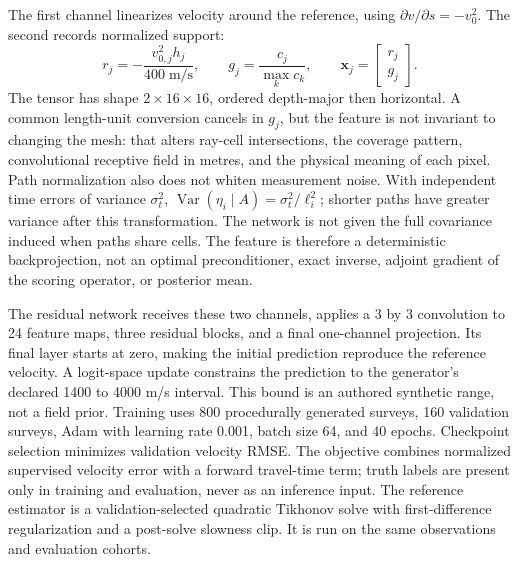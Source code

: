 The first channel linearizes velocity around the reference, using
$\partial v/\partial s=-v_0^2$. The second records normalized support:
\begin{equation}\label{eq:geometry-normalized-input}
 r_j=-\frac{v_{0,j}^2h_j}{400\;\mathrm{m/s}},\qquad
 g_j=\frac{c_j}{\max_k c_k},\qquad
 \mathbf x_j=\begin{bmatrix}r_j\\g_j\end{bmatrix}.
\end{equation}
The tensor has shape $2\times16\times16$, ordered depth-major then
horizontal. A common length-unit conversion cancels in $g_j$, but the
feature is not invariant to changing the mesh: that alters ray-cell
intersections, the coverage pattern, convolutional receptive field in
metres, and the physical meaning of each pixel. Path normalization also
does not whiten measurement noise. With independent time errors of
variance $\sigma_t^2$, $\operatorname{Var}(\eta_i\mid A)=
\sigma_t^2/\ell_i^2$; shorter paths have greater variance after this
transformation. The network is not given the full covariance induced
when paths share cells. The feature is therefore a deterministic
backprojection, not an optimal preconditioner, exact inverse, adjoint
gradient of the scoring operator, or posterior mean.

The residual network receives these two channels, applies a 3 by 3
convolution to 24 feature maps, three residual blocks, and a final
one-channel projection. Its final layer starts at zero, making the
initial prediction reproduce the reference velocity. A logit-space
update constrains the prediction to the generator's declared 1400 to
4000 m/s interval. This bound is an authored synthetic range, not a
field prior. Training uses 800 procedurally generated surveys, 160
validation surveys, Adam with learning rate 0.001, batch size 64, and
40 epochs. Checkpoint selection minimizes validation velocity RMSE.
The objective combines normalized supervised velocity error with a
forward travel-time term; truth labels are present only in training and
evaluation, never as an inference input. The reference estimator is a
validation-selected quadratic Tikhonov solve with first-difference
regularization and a post-solve slowness clip. It is run on the same
observations and evaluation cohorts.

